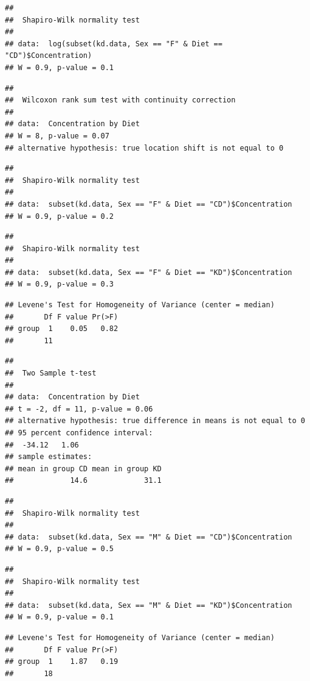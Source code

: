 \documentclass[]{article}
\begin{document}
\begin{verbatim}
## 
##  Shapiro-Wilk normality test
## 
## data:  log(subset(kd.data, Sex == "F" & Diet == "CD")$Concentration)
## W = 0.9, p-value = 0.1
\end{verbatim}

\begin{verbatim}
## 
##  Wilcoxon rank sum test with continuity correction
## 
## data:  Concentration by Diet
## W = 8, p-value = 0.07
## alternative hypothesis: true location shift is not equal to 0
\end{verbatim}

\begin{verbatim}
## 
##  Shapiro-Wilk normality test
## 
## data:  subset(kd.data, Sex == "F" & Diet == "CD")$Concentration
## W = 0.9, p-value = 0.2
\end{verbatim}

\begin{verbatim}
## 
##  Shapiro-Wilk normality test
## 
## data:  subset(kd.data, Sex == "F" & Diet == "KD")$Concentration
## W = 0.9, p-value = 0.3
\end{verbatim}

\begin{verbatim}
## Levene's Test for Homogeneity of Variance (center = median)
##       Df F value Pr(>F)
## group  1    0.05   0.82
##       11
\end{verbatim}

\begin{verbatim}
## 
##  Two Sample t-test
## 
## data:  Concentration by Diet
## t = -2, df = 11, p-value = 0.06
## alternative hypothesis: true difference in means is not equal to 0
## 95 percent confidence interval:
##  -34.12   1.06
## sample estimates:
## mean in group CD mean in group KD 
##             14.6             31.1
\end{verbatim}

\begin{verbatim}
## 
##  Shapiro-Wilk normality test
## 
## data:  subset(kd.data, Sex == "M" & Diet == "CD")$Concentration
## W = 0.9, p-value = 0.5
\end{verbatim}

\begin{verbatim}
## 
##  Shapiro-Wilk normality test
## 
## data:  subset(kd.data, Sex == "M" & Diet == "KD")$Concentration
## W = 0.9, p-value = 0.1
\end{verbatim}

\begin{verbatim}
## Levene's Test for Homogeneity of Variance (center = median)
##       Df F value Pr(>F)
## group  1    1.87   0.19
##       18
\end{verbatim}
\end{document}
